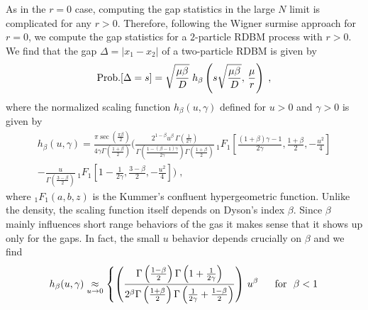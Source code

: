 \documentclass[onecolumn,superscriptaddress,
 amsmath,amssymb,
 aps,
 prd,
]{revtex4-1}
\begin{document}
{\vspace{0.3cm}
 As in the $r=0$ case, computing the gap statistics in the large $N$ limit is complicated for any $r>0$. Therefore, following the Wigner surmise approach for $r=0$, we compute the gap statistics for a $2$-particle RDBM process with $r>0$. We find that the gap $\Delta = |x_1 - x_2|$ of a two-particle RDBM is given by
{
\begin{equation} \label{eq:main-gap}
{\rm Prob.}[\Delta = s] = \sqrt{\frac{\mu \beta}{D}} \; h_\beta\left( s \sqrt{\frac{\mu \beta}{D}}, \, \frac{\mu}{r} \right) \;,
\end{equation}}%
where the normalized scaling function $h_\beta(u, \gamma)$ defined for $u > 0$ and $\gamma > 0$ is given by
\begin{eqnarray} \label{eq:main-h}
h_\beta(u, \gamma) = \frac{\pi \sec(\frac{\pi \beta}{2})}{4 \gamma \Gamma\left( \frac{1 + \beta}{2} \right)} \Bigg( \frac{2^{1 - \beta} u^\beta \, \Gamma\left(\frac{1}{2\gamma}\right)}{\Gamma\left(\frac{1 - (\beta - 1)\gamma}{2 \gamma}\right) \Gamma\left( \frac{1+\beta}{2}\right) } \,_1 {F}_1\left[ \frac{(1 + \beta)\gamma - 1}{2 \gamma}, \frac{1+\beta}{2}, - \frac{u^2}{4} \right] \nonumber\\
- \frac{u}{\Gamma\left( \frac{3-\beta}{2}\right) }  \,_1 {F}_1\left[ 1 - \frac{1}{2\gamma}, \frac{3 - \beta}{2}, - \frac{u^2}{4} \right] \Bigg) \;,
\end{eqnarray}
where $_1F_1(a,b,z)$ is the Kummer's confluent hypergeometric function. Unlike the density, the scaling function itself depends on Dyson's index $\beta$. Since $\beta$ mainly influences short range behaviors of the gas it makes sense that it shows up only for the gaps. In fact, the small $u$ behavior depends crucially on $\beta$ and we find
%
\begin{equation} \label{eq:main-h-asymptotics-small-z}
h_\beta(u, \gamma) \underset{u \to 0}{\approx} \begin{dcases}
\left( \frac{\Gamma\left(\frac{1 - \beta}{2}\right) \Gamma\left(1 + \frac{1}{2\gamma}\right) }{2^\beta \Gamma\left(\frac{1 + \beta}{2}\right) \Gamma\left( \frac{1}{2\gamma} + \frac{1 - \beta}{2} \right)} \right)\,u^\beta & \mbox{~~for~~} \beta < 1 \\

\end{dcases}
\end{equation}}
\end{document}
